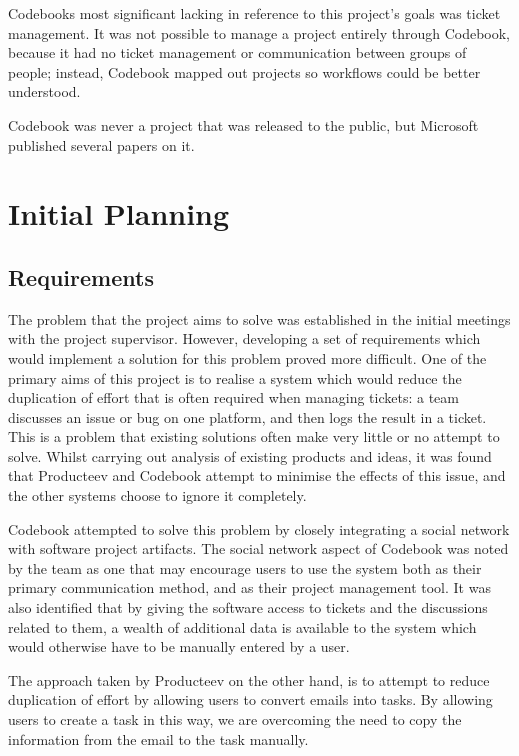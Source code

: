 \documentclass[a4paper]{l3proj}
\begin{document}
Codebooks most significant lacking in reference to this project’s goals was ticket management. It was not possible to manage a project entirely through Codebook, because it had no ticket management or communication between groups of people; instead, Codebook mapped out projects so workflows could be better understood.

Codebook was never a project that was released to the public, but Microsoft published several papers on it.


\chapter{Initial Planning}
\label{initialPlanning}

\section{Requirements}
\label{requirements}

The problem that the project aims to solve was established in the initial meetings with the project supervisor. However, developing a set of requirements which would implement a solution for this problem proved more difficult. One of the primary aims of this project is to realise a system which would reduce the duplication of effort that is often required when managing tickets: a team discusses an issue or bug on one platform, and then logs the result in a ticket. This is a problem that existing solutions often make very little or no attempt to solve. Whilst carrying out analysis of existing products and ideas, it was found that Producteev and Codebook attempt to minimise the effects of this issue, and the other systems choose to ignore it completely.

Codebook attempted to solve this problem by closely integrating a social network with software project artifacts. The social network aspect of Codebook was noted by the team as one that may encourage users to use the system both as their primary communication method, and as their project management tool. It was also identified that by giving the software access to tickets and the discussions related to them, a wealth of additional data is available to the system which would otherwise have to be manually entered by a user.

The approach taken by Producteev on the other hand, is to attempt to reduce duplication of effort by allowing users to convert emails into tasks. By allowing users to create a task in this way, we are overcoming the need to copy the information from the email to the task manually.
\end{document}
